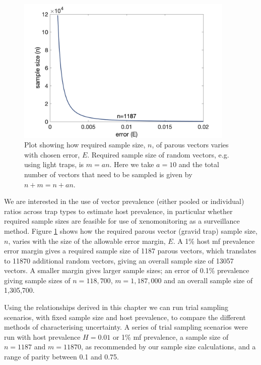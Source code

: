 \begin{figure}[ht]
\begin{center}
\includegraphics[height=7cm]{Project/Figures/Xeno/VaryError.png}
\end{center}
\caption[Sample size calculations.]{Plot showing how required sample size, $n$, of parous vectors varies with chosen error, $E$. Required sample size of random vectors, e.g. using light traps, is $m=an$. Here we take $a=10$ and the total number of vectors that need to be sampled is given by $n + m = n+an$.}
\label{fig:error}
\end{figure}

We are interested in the use of vector prevalence (either pooled or individual) ratios across trap types to estimate host prevalence, in particular whether required sample sizes are feasible for use of xenomonitoring as a surveillance method. Figure \ref{fig:error} shows how the required parous vector (gravid trap) sample size, $n$, varies with the size of the allowable error margin, $E$. A 1\% host mf prevalence error margin gives a required sample size of 1187 parous vectors, which translates to 11870 additional random vectors, giving an overall sample size of 13057 vectors. A smaller margin gives larger sample sizes; an error of 0.1\% prevalence giving sample sizes of $n=118,700$, $m=1,187,000$ and an overall sample size of 1,305,700.

\FloatBarrier

Using the relationships derived in this chapter we can run trial sampling scenarios, with fixed sample size and host prevalence, to compare the different methods of characterising uncertainty. A series of trial sampling scenarios were run with host prevalence $H=0.01$ or 1\% mf prevalence, a sample size of $n=1187$ and $m=11870$, as recommended by our sample size calculations, and a range of parity between 0.1 and 0.75. 

